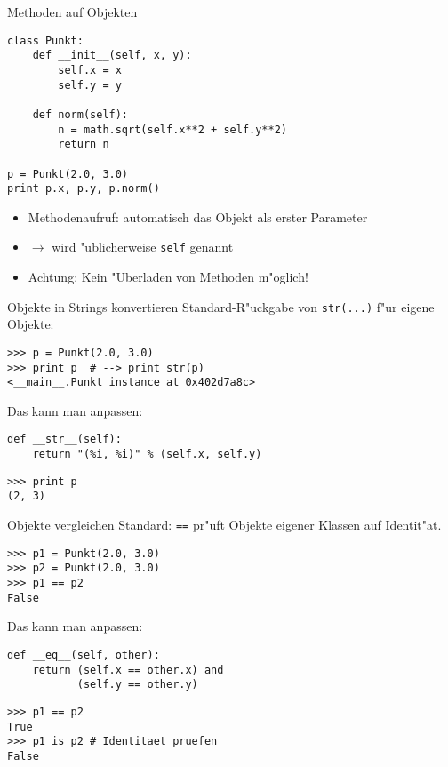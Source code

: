 \begin{frame}[fragile]{Methoden auf Objekten}
\begin{lstlisting}[style=Python]
class Punkt:
    def __init__(self, x, y):
        self.x = x
        self.y = y

    def norm(self):
        n = math.sqrt(self.x**2 + self.y**2)
        return n

p = Punkt(2.0, 3.0)
print p.x, p.y, p.norm()
\end{lstlisting}
\begin{itemize}
\item Methodenaufruf: automatisch das Objekt als erster Parameter
\item $\rightarrow$ wird "ublicherweise \lstinline{self} genannt
\item\alert{Achtung}: Kein "Uberladen von Methoden m"oglich!
\end{itemize}
\end{frame}

\begin{frame}[fragile]{Objekte in Strings konvertieren}
Standard-R"uckgabe von \lstinline{str(...)} f"ur eigene Objekte:
\begin{lstlisting}[style=Shell]
>>> p = Punkt(2.0, 3.0)
>>> print p  # --> print str(p)
<__main__.Punkt instance at 0x402d7a8c>
\end{lstlisting}
\vspace{2mm}

Das kann man anpassen:
\begin{lstlisting}[style=Python]
def __str__(self):
    return "(%i, %i)" % (self.x, self.y)
\end{lstlisting}
\begin{lstlisting}[style=Shell]
>>> print p
(2, 3)
 \end{lstlisting}
\end{frame}

\begin{frame}[fragile]{Objekte vergleichen}
Standard: \texttt{==} pr"uft Objekte eigener Klassen auf Identit"at.
\begin{lstlisting}[style=Shell]
>>> p1 = Punkt(2.0, 3.0)
>>> p2 = Punkt(2.0, 3.0)
>>> p1 == p2
False
\end{lstlisting}
Das kann man anpassen:
\begin{lstlisting}[style=Python]
def __eq__(self, other):
    return (self.x == other.x) and
           (self.y == other.y)
\end{lstlisting}
\begin{lstlisting}[style=Shell]
>>> p1 == p2
True
>>> p1 is p2 # Identitaet pruefen
False
\end{lstlisting}
\end{frame}

